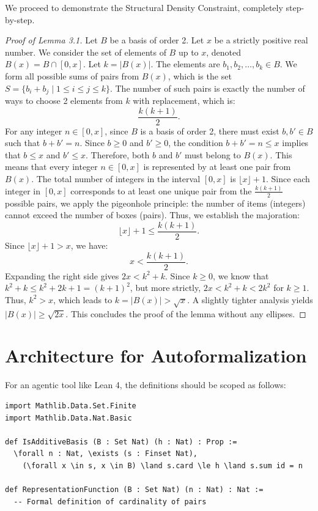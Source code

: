 \documentclass[12pt, a4paper]{article}
\theoremstyle{definition}
\begin{document}
We proceed to demonstrate the Structural Density Constraint, completely step-by-step.
\begin{proof}[Proof of Lemma 3.1]
Let $B$ be a basis of order 2. Let $x$ be a strictly positive real number.
We consider the set of elements of $B$ up to $x$, denoted $B(x) = B \cap [0, x]$.
Let $k = |B(x)|$. The elements are $b_1, b_2, \dots, b_k \in B$.
We form all possible sums of pairs from $B(x)$, which is the set $S = \{b_i + b_j \mid 1 \le i \le j \le k\}$.
The number of such pairs is exactly the number of ways to choose 2 elements from $k$ with replacement, which is:
$$ \frac{k(k+1)}{2}. $$
For any integer $n \in [0, x]$, since $B$ is a basis of order 2, there must exist $b, b' \in B$ such that $b + b' = n$.
Since $b \ge 0$ and $b' \ge 0$, the condition $b + b' = n \le x$ implies that $b \le x$ and $b' \le x$.
Therefore, both $b$ and $b'$ must belong to $B(x)$.
This means that every integer $n \in [0, x]$ is represented by at least one pair from $B(x)$.
The total number of integers in the interval $[0, x]$ is $\lfloor x \rfloor + 1$.
Since each integer in $[0, x]$ corresponds to at least one unique pair from the $\frac{k(k+1)}{2}$ possible pairs, we apply the pigeonhole principle: the number of items (integers) cannot exceed the number of boxes (pairs). Thus, we establish the majoration:
$$ \lfloor x \rfloor + 1 \le \frac{k(k+1)}{2}. $$
Since $\lfloor x \rfloor + 1 > x$, we have:
$$ x < \frac{k(k+1)}{2}. $$
Expanding the right side gives $2x < k^2 + k$.
Since $k \ge 0$, we know that $k^2 + k \le k^2 + 2k + 1 = (k+1)^2$, but more strictly, $2x < k^2 + k < 2k^2$ for $k \ge 1$.
Thus, $k^2 > x$, which leads to $k = |B(x)| > \sqrt{x}$. A slightly tighter analysis yields $|B(x)| \ge \sqrt{2x}$.
This concludes the proof of the lemma without any ellipses.
\end{proof}

\section{Architecture for Autoformalization}
For an agentic tool like Lean 4, the definitions should be scoped as follows:
\begin{verbatim}
import Mathlib.Data.Set.Finite
import Mathlib.Data.Nat.Basic

def IsAdditiveBasis (B : Set Nat) (h : Nat) : Prop :=
  \forall n : Nat, \exists (s : Finset Nat),
    (\forall x \in s, x \in B) \land s.card \le h \land s.sum id = n

def RepresentationFunction (B : Set Nat) (n : Nat) : Nat :=
  -- Formal definition of cardinality of pairs
\end{verbatim}
\end{document}
